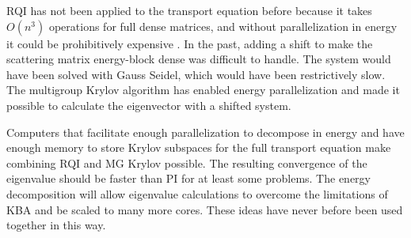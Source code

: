 RQI has not been applied to the transport equation before because it takes $O(n^{3})$ operations for full dense matrices, and without parallelization in energy it could be prohibitively expensive \cite{Stewart2001}. In the past, adding a shift to make the scattering matrix energy-block dense was difficult to handle. The system would have been solved with Gauss Seidel, which would have been restrictively slow. The multigroup Krylov algorithm has enabled energy parallelization and made it possible to calculate the eigenvector with a shifted system.

Computers that facilitate enough parallelization to decompose in energy and have enough memory to store Krylov subspaces for the full transport equation make combining RQI and MG Krylov possible. The resulting convergence of the eigenvalue should be faster than PI for at least some problems. The energy decomposition will allow eigenvalue calculations to overcome the limitations of KBA and be scaled to many more cores. These ideas have never before been used together in this way. 

\separatorpage{}
